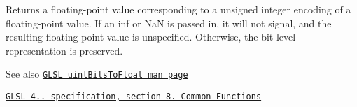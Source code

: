 Returns a floating-\/point value corresponding to a unsigned integer encoding of a floating-\/point value. If an inf or NaN is passed in, it will not signal, and the resulting floating point value is unspecified. Otherwise, the bit-\/level representation is preserved.

\begin{DoxySeeAlso}{See also}
\href{http://www.opengl.org/sdk/docs/manglsl/xhtml/uintBitsToFloat.xml}{\tt G\+L\+SL uint\+Bits\+To\+Float man page} 

\href{http://www.opengl.org/registry/doc/GLSLangSpec.4.20.8.pdf}{\tt G\+L\+SL 4.. specification, section 8. Common Functions} 
\end{DoxySeeAlso}
